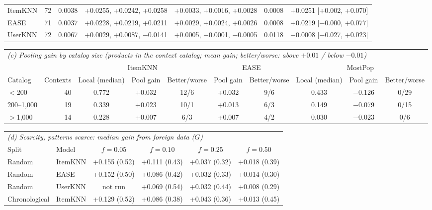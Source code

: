 \begin{table}[H]
\begin{tabular}{lcccccc}
ItemKNN & 72 & 0.0038 & +0.0255, +0.0242, +0.0258 & +0.0033, +0.0016, +0.0028 & 0.0008 & +0.0251 [+0.002, +0.070] \\
EASE & 71 & 0.0037 & +0.0228, +0.0219, +0.0211 & +0.0029, +0.0024, +0.0026 & 0.0008 & +0.0219 [$-$0.000, +0.077] \\
UserKNN & 72 & 0.0067 & +0.0029, +0.0087, $-$0.0141 & +0.0005, $-$0.0001, $-$0.0005 & 0.0118 & $-$0.0008 [$-$0.027, +0.023] \\
\bottomrule
\end{tabular}\par\vspace{4pt}
\begin{tabular}{lrcccccccc}
\toprule
\multicolumn{10}{l}{\textit{(c) Pooling gain by catalog size (products in the context catalog; mean gain; better/worse: above $+0.01$ / below $-0.01$)}} \\
 & & \multicolumn{3}{c}{ItemKNN} & \multicolumn{2}{c}{EASE} & \multicolumn{3}{c}{MostPop} \\
\cmidrule(lr){3-5}\cmidrule(lr){6-7}\cmidrule(lr){8-10}
Catalog & Contexts & Local (median) & Pool gain & Better/worse & Pool gain & Better/worse & Local (median) & Pool gain & Better/worse \\
\midrule
$<$200 & 40 & 0.772 & +0.032 & 12/6 & +0.032 & 9/6 & 0.433 & $-$0.126 & 0/29 \\
200--1,000 & 19 & 0.339 & +0.023 & 10/1 & +0.013 & 6/3 & 0.149 & $-$0.079 & 0/15 \\
$>$1,000 & 14 & 0.228 & +0.007 & 6/3 & +0.007 & 4/2 & 0.030 & $-$0.023 & 0/6 \\
\bottomrule
\end{tabular}\par\vspace{4pt}
\begin{tabular}{llcccc}
\toprule
\multicolumn{6}{l}{\textit{(d) Scarcity, patterns scarce: median gain from foreign data ($G$)}} \\
Split & Model & $f=0.05$ & $f=0.10$ & $f=0.25$ & $f=0.50$ \\
\midrule
Random & ItemKNN & +0.155 (0.52) & +0.111 (0.43) & +0.037 (0.32) & +0.018 (0.39) \\
Random & EASE & +0.152 (0.50) & +0.086 (0.42) & +0.032 (0.33) & +0.014 (0.30) \\
Random & UserKNN & not run & +0.069 (0.54) & +0.032 (0.44) & +0.008 (0.29) \\
Chronological & ItemKNN & +0.129 (0.52) & +0.086 (0.38) & +0.043 (0.36) & +0.013 (0.45) \\

\end{tabular}
\end{table}
